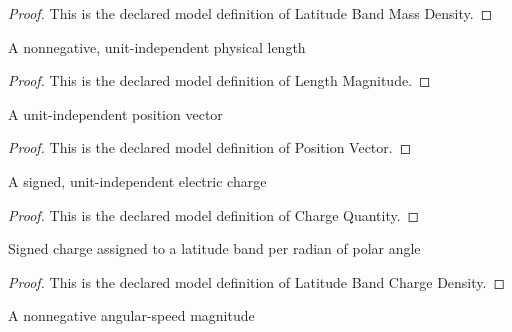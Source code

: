 \begin{proof}
  This is the declared model definition of Latitude Band Mass Density.
\end{proof}
\begin{definition}
  \label{def:physics:phyx-mini-0970:phyxminiproblems-problemphyxmini0970-lengthmagnitude}
  A nonnegative, unit-independent physical length
\end{definition}
\begin{proof}
  This is the declared model definition of Length Magnitude.
\end{proof}
\begin{definition}
  \label{def:physics:phyx-mini-0970:phyxminiproblems-problemphyxmini0970-positionvector}
  A unit-independent position vector
\end{definition}
\begin{proof}
  This is the declared model definition of Position Vector.
\end{proof}
\begin{definition}
  \label{def:physics:phyx-mini-0970:phyxminiproblems-problemphyxmini0970-chargequantity}
  A signed, unit-independent electric charge
\end{definition}
\begin{proof}
  This is the declared model definition of Charge Quantity.
\end{proof}
\begin{definition}
  \label{def:physics:phyx-mini-0970:phyxminiproblems-problemphyxmini0970-latitudebandchargedensity}
  Signed charge assigned to a latitude band per radian of polar angle
\end{definition}
\begin{proof}
  This is the declared model definition of Latitude Band Charge Density.
\end{proof}
\begin{definition}
  \label{def:physics:phyx-mini-0970:phyxminiproblems-problemphyxmini0970-angularspeedmagnitude}
  A nonnegative angular-speed magnitude
\end{definition}
